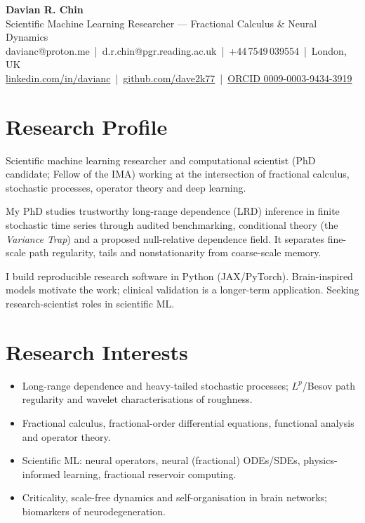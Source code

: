 \documentclass[10pt,a4paper]{article}
\begin{document}
{\Huge\bfseries\color{accent} Davian R. Chin}\\[3pt]
{\large Scientific Machine Learning Researcher --- Fractional Calculus \& Neural Dynamics}\\[5pt]
{\small
davianc@proton.me \,|\, d.r.chin@pgr.reading.ac.uk \,|\, +44\,7549\,039554 \,|\, London, UK\\
\href{https://www.linkedin.com/in/davianc}{linkedin.com/in/davianc} \,|\,
\href{https://github.com/dave2k77}{github.com/dave2k77} \,|\,
\href{https://orcid.org/0009-0003-9434-3919}{ORCID 0009-0003-9434-3919}}

\section{Research Profile}
Scientific machine learning researcher and computational scientist (PhD candidate; Fellow of the IMA) working at the intersection of fractional calculus, stochastic processes, operator theory and deep learning.

My PhD studies trustworthy long-range dependence (LRD) inference in finite stochastic time series through audited benchmarking, conditional theory (the \emph{Variance Trap}) and a proposed null-relative dependence field. It separates fine-scale path regularity, tails and nonstationarity from coarse-scale memory.

I build reproducible research software in Python (JAX/PyTorch). Brain-inspired models motivate the work; clinical validation is a longer-term application. Seeking research-scientist roles in scientific ML.

\section{Research Interests}
\begin{itemize}[leftmargin=1.3em,itemsep=1pt,topsep=2pt]
  \item Long-range dependence and heavy-tailed stochastic processes; $L^p$/Besov path regularity and wavelet characterisations of roughness.
  \item Fractional calculus, fractional-order differential equations, functional analysis and operator theory.
  \item Scientific ML: neural operators, neural (fractional) ODEs/SDEs, physics-informed learning, fractional reservoir computing.
  \item Criticality, scale-free dynamics and self-organisation in brain networks; biomarkers of neurodegeneration.
\end{itemize}
\end{document}
